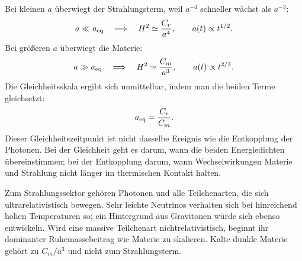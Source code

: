 Bei kleinen \(a\) überwiegt der Strahlungsterm, weil \(a^{-4}\) schneller wächst als \(a^{-3}\):
\begin{equation}
a\ll a_{\rm eq}
\quad\Longrightarrow\quad
H^2\simeq\frac{C_r}{a^4},
\qquad
a(t)\propto t^{1/2}.
\end{equation}
Bei größeren \(a\) überwiegt die Materie:
\begin{equation}
a\gg a_{\rm eq}
\quad\Longrightarrow\quad
H^2\simeq\frac{C_m}{a^3},
\qquad
a(t)\propto t^{2/3}.
\end{equation}
Die Gleichheitsskala ergibt sich unmittelbar, indem man die beiden Terme gleichsetzt:
\begin{equation}
a_{\rm eq}=\frac{C_r}{C_m}.
\label{eq:c02-equality-scale}
\end{equation}
Dieser Gleichheitszeitpunkt ist nicht dasselbe Ereignis wie die Entkopplung der Photonen. Bei der Gleichheit geht es darum, wann die beiden Energiedichten übereinstimmen; bei der Entkopplung darum, wann Wechselwirkungen Materie und Strahlung nicht länger im thermischen Kontakt halten.

Zum Strahlungssektor gehören Photonen und alle Teilchenarten, die sich ultrarelativistisch bewegen. Sehr leichte Neutrinos verhalten sich bei hinreichend hohen Temperaturen so; ein Hintergrund aus Gravitonen würde sich ebenso entwickeln. Wird eine massive Teilchenart nichtrelativistisch, beginnt ihr dominanter Ruhemassebeitrag wie Materie zu skalieren. Kalte dunkle Materie gehört zu \(C_m/a^3\) und nicht zum Strahlungsterm.

\begin{classroomqa}
\end{classroomqa}

\begin{classroomqa}
\end{classroomqa}

